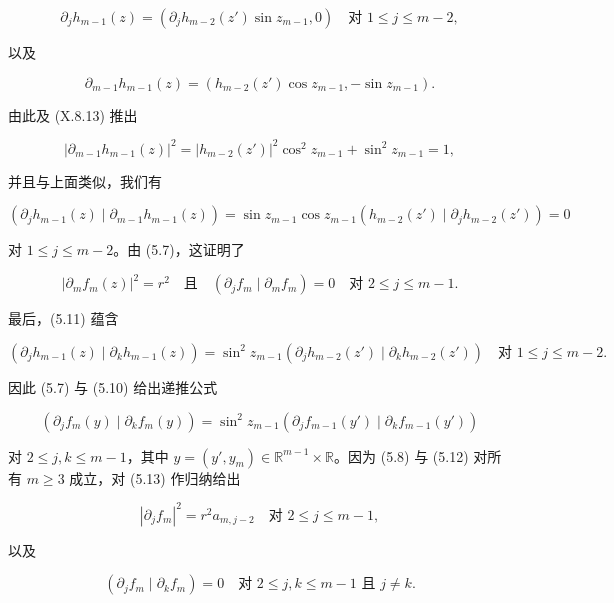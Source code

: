 \begin{example}
\begin{items}
\begin{equation}
\partial_{j}h_{m-1}(z) = \left(\partial_{j}h_{m-2}(z') \sin z_{m-1}, 0\right) \quad \text{对 } 1 \le j \le m-2 ,\tag{5.11}
\end{equation}

以及

\[
\partial_{m-1}h_{m-1}(z) = \left(h_{m-2}(z') \cos z_{m-1}, -\sin z_{m-1}\right) .
\]

由此及 (X.8.13) 推出

\[
|\partial_{m-1}h_{m-1}(z)|^{2} = |h_{m-2}(z')|^{2}\cos^{2} z_{m-1} + \sin^{2} z_{m-1} = 1 ,
\]

并且与上面类似，我们有

\[
(\partial_{j}h_{m-1}(z) \mid \partial_{m-1}h_{m-1}(z)) = \sin z_{m-1}\cos z_{m-1}(h_{m-2}(z') \mid \partial_{j}h_{m-2}(z')) = 0
\]

对 $ 1 \le j \le m-2 $。由 (5.7)，这证明了

\begin{equation}
|\partial_m f_m(z)|^2 = r^2 \quad \text{且} \quad (\partial_j f_m \mid \partial_m f_m) = 0 \quad \text{对 } 2 \le j \le m-1.\tag{5.12}
\end{equation}

最后，(5.11) 蕴含

\[
(\partial_j h_{m-1}(z) \mid \partial_k h_{m-1}(z)) = \sin^2 z_{m-1} (\partial_j h_{m-2}(z') \mid \partial_k h_{m-2}(z')) \quad \text{对 } 1 \le j \le m-2.
\]

因此 (5.7) 与 (5.10) 给出递推公式

\begin{equation}
(\partial_j f_m(y) \mid \partial_k f_m(y)) = \sin^2 z_{m-1} (\partial_j f_{m-1}(y') \mid \partial_k f_{m-1}(y'))\tag{5.13}
\end{equation}

对 $ 2 \le j,k \le m-1 $，其中 $ y = (y', y_m) \in \mathbb{R}^{m-1} \times \mathbb{R} $。因为 (5.8) 与 (5.12) 对所有 $ m \ge 3 $ 成立，对 (5.13) 作归纳给出

\begin{equation}
|\partial_j f_m|^2 = r^2 a_{m,j-2} \quad \text{对 } 2 \le j \le m-1,\tag{5.14}
\end{equation}

以及

\begin{equation}
(\partial_j f_m \mid \partial_k f_m) = 0 \quad \text{对 } 2 \le j,k \le m-1 \text{ 且 } j \ne k.\tag{5.15}
\end{equation}


\end{items}
\end{example}
